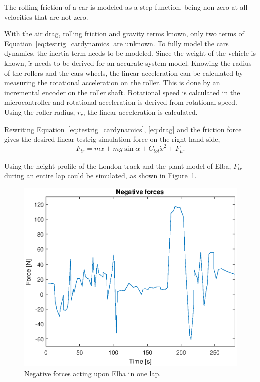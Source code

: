 The rolling friction of a car is modeled as a step function, being non-zero at
all velocities that are not zero.

With the air drag, rolling friction and gravity terms known, only two terms of
Equation~\ref{eq:testrig_cardynamics} are unknown. To fully model the cars
dynamics, the inertia term needs to be modeled. Since the weight of the vehicle
is known, $\ddot{x}$ needs to be derived for an accurate system model.
Knowing the radius of the rollers and the cars wheels, the linear acceleration
can be calculated by measuring the rotational acceleration on the roller. This
is done by an incremental encoder on the roller shaft. Rotational speed is
calculated in the microcontroller and rotational acceleration is derived from
rotational speed. Using the roller radius, $r_{r}$, the linear acceleration
is calculated.

Rewriting Equation~\ref{eq:testrig_cardynamics}, \ref{eq:drag} and the friction force gives the
desired linear testrig simulation force on the right hand side,
\begin{equation} \label{eq:simulationforce}
    F_{tr} = m\ddot{x} + mg\sin{\alpha} + C_{tot}\dot{x}^2 + F_{\mu}.
\end{equation}

Using the height profile of the London track and the plant model of Elba,
$F_{tr}$ during an entire lap could be simulated, as shown in
Figure~\ref{fig:testrig_negative_forces}.

\begin{figure}[H]
    \centering
    \includegraphics[width=\textwidth]{./img/testrig_negative_forces.eps}
    \caption{Negative forces acting upon Elba in one
    lap.}\label{fig:testrig_negative_forces}
\end{figure}

